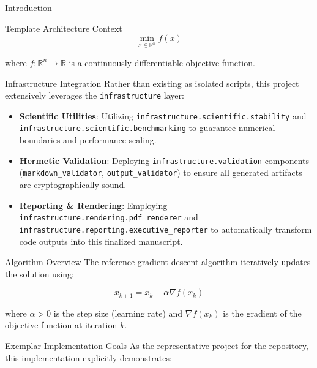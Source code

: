\documentclass[
  ignorenonframetext,
]{beamer}
\providecommand{\tightlist}{%
  \setlength{\itemsep}{0pt}\setlength{\parskip}{0pt}}
\begin{document}
\begin{frame}[fragile]{Introduction}
\begin{block}{Template Architecture Context}
\begin{equation}
\label{eq:optimization_problem}
\min_{x \in \mathbb{R}^n} f(x)
\end{equation}

where \(f: \mathbb{R}^n \rightarrow \mathbb{R}\) is a continuously
differentiable objective function.
\end{block}

\begin{block}{Infrastructure Integration}
\protect{}\label{infrastructure-integration}
Rather than existing as isolated scripts, this project extensively
leverages the \texttt{infrastructure} layer:

\begin{itemize}
\tightlist
\item
  \textbf{Scientific Utilities}: Utilizing
  \texttt{infrastructure.scientific.stability} and
  \texttt{infrastructure.scientific.benchmarking} to guarantee numerical
  boundaries and performance scaling.
\item
  \textbf{Hermetic Validation}: Deploying
  \texttt{infrastructure.validation} components
  (\texttt{markdown\_validator}, \texttt{output\_validator}) to ensure
  all generated artifacts are cryptographically sound.
\item
  \textbf{Reporting \& Rendering}: Employing
  \texttt{infrastructure.rendering.pdf\_renderer} and
  \texttt{infrastructure.reporting.executive\_reporter} to automatically
  transform code outputs into this finalized manuscript.
\end{itemize}
\end{block}

\begin{block}{Algorithm Overview}
\protect{}\label{algorithm-overview}
The reference gradient descent algorithm iteratively updates the
solution using:

\begin{equation}
\label{eq:gradient_descent_update}
x_{k+1} = x_k - \alpha \nabla f(x_k)
\end{equation}

where \(\alpha > 0\) is the step size (learning rate) and
\(\nabla f(x_k)\) is the gradient of the objective function at iteration
\(k\).
\end{block}

\begin{block}{Exemplar Implementation Goals}
\protect{}\label{exemplar-implementation-goals}
As the representative project for the repository, this implementation
explicitly demonstrates:


\end{block}
\end{frame}
\end{document}
